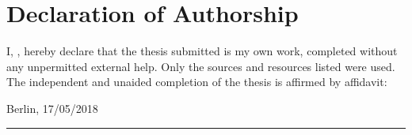 

\chapter*{Declaration of Authorship}
	\noindent I, \textsc{\trauthor}, hereby declare that the thesis submitted is my own work, completed without any unpermitted external help. Only the sources and resources listed were used.\\
	
	
	\noindent
	The independent and unaided completion of the thesis is affirmed by affidavit:
	
	
\vspace{5cm}
	
	

	
	Berlin, 17/05/2018   	\hfill \rule[0.5em]{15em}{0.5pt} %
	\begin{flushright}
		
	\end{flushright}
	
